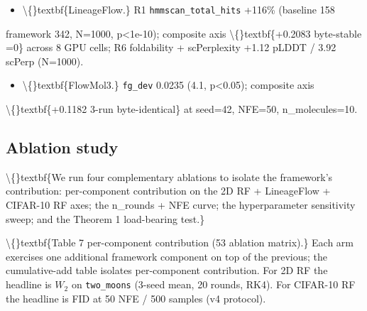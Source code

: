 \documentclass[preprint,3p,times,twocolumn]{elsarticle}
\begin{document}
\begin{itemize}
\item \textbackslash\{\}textbf\{LineageFlow.\} R1 \texttt{hmmscan\_total\_hits} +116\% (baseline 158 
\end{itemize}
framework 342, N=1000, p<1e-10); composite axis \textbackslash\{\}textbf\{+0.2083 byte-stable =0\} across 8 GPU cells; R6 foldability + scPerplexity +1.12 pLDDT / 3.92 scPerp (N=1000).

\begin{itemize}
\item \textbackslash\{\}textbf\{FlowMol3.\} \texttt{fg\_dev} 0.0235 (4.1, p<0.05); composite axis
\end{itemize}
\textbackslash\{\}textbf\{+0.1182 3-run byte-identical\} at seed=42, NFE=50, n\_molecules=10.

\subsection{Ablation study}
\textbackslash\{\}textbf\{We run four complementary ablations to isolate the framework's contribution: per-component contribution on the 2D RF + LineageFlow + CIFAR-10 RF axes; the n\_rounds + NFE curve; the hyperparameter sensitivity sweep; and the Theorem 1 load-bearing test.\}

\textbackslash\{\}textbf\{Table 7  per-component contribution (53 ablation matrix).\} Each arm exercises one additional framework component on top of the previous; the cumulative-add table isolates per-component contribution. For 2D RF the headline is $W_2$ on \texttt{two\_moons} (3-seed mean, 20 rounds, RK4). For CIFAR-10 RF the headline is FID at 50 NFE / 500 samples (v4 protocol).
\end{document}
